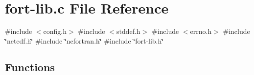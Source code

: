 \hypertarget{fort-lib_8c}{}\section{fort-\/lib.c File Reference}
\label{fort-lib_8c}
{\ttfamily \#include $<$config.\+h$>$}\newline
{\ttfamily \#include $<$stddef.\+h$>$}\newline
{\ttfamily \#include $<$errno.\+h$>$}\newline
{\ttfamily \#include \char`\"{}netcdf.\+h\char`\"{}}\newline
{\ttfamily \#include \char`\"{}ncfortran.\+h\char`\"{}}\newline
{\ttfamily \#include \char`\"{}fort-\/lib.\+h\char`\"{}}\newline
\subsection*{Functions}
